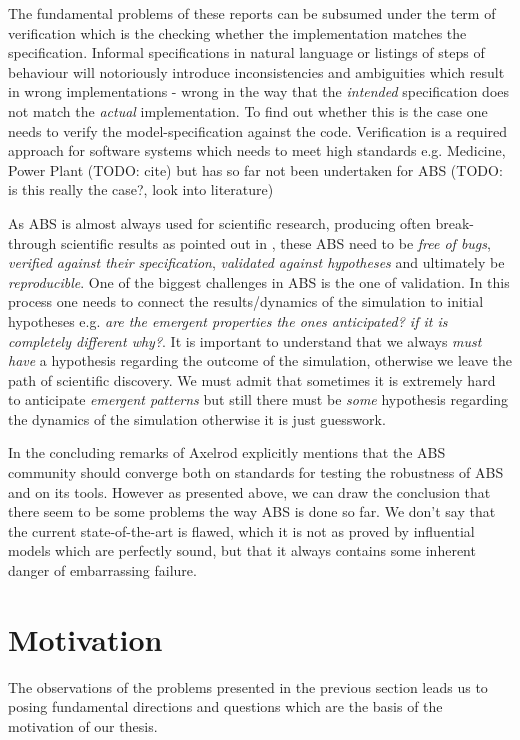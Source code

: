 The fundamental problems of these reports can be subsumed under the term of verification which is the checking whether the implementation matches the specification. Informal specifications in natural language or listings of steps of behaviour will notoriously introduce inconsistencies and ambiguities which result in wrong implementations - wrong in the way that the \textit{intended} specification does not match the \textit{actual} implementation. To find out whether this is the case one needs to verify the model-specification against the code. Verification is a required approach for software systems which needs to meet high standards e.g. Medicine, Power Plant (TODO: cite) but has so far not been undertaken for ABS (TODO: is this really the case?, look into literature)

As ABS is almost always used for scientific research, producing often break-through scientific results as pointed out in \cite{axelrod_chapter_2006}, these ABS need to be \textit{free of bugs}, \textit{verified against their specification}, \textit{validated against hypotheses} and ultimately be \textit{reproducible}. One of the biggest challenges in ABS is the one of validation. In this process one needs to connect the results/dynamics of the simulation to initial hypotheses e.g. \textit{are the emergent properties the ones anticipated? if it is completely different why?}. It is important to understand that we always \textit{must have} a hypothesis regarding the outcome of the simulation, otherwise we leave the path of scientific discovery. We must admit that sometimes it is extremely hard to anticipate \textit{emergent patterns} but still there must be \textit{some} hypothesis regarding the dynamics of the simulation otherwise it is just guesswork.

In the concluding remarks of \cite{axelrod_chapter_2006} Axelrod explicitly mentions that the ABS community should converge both on standards for testing the robustness of ABS and on its tools. However as presented above, we can draw the conclusion that there seem to be some problems the way ABS is done so far. We don't say that the current state-of-the-art is flawed, which it is not as proved by influential models which are perfectly sound, but that it always contains some inherent danger of embarrassing failure.

\section{Motivation}
The observations of the problems presented in the previous section leads us to posing fundamental directions and questions which are the basis of the motivation of our thesis.


